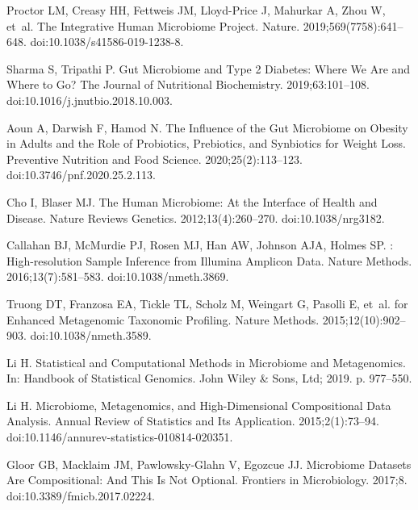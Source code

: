 \documentclass[10pt,letterpaper]{article}
\begin{document}
\begin{thebibliography}{10}

Proctor LM, Creasy HH, Fettweis JM, {Lloyd-Price} J, Mahurkar A, Zhou W, et~al.
\newblock The {{Integrative Human Microbiome Project}}.
\newblock Nature. 2019;569(7758):641--648.
\newblock doi:{10.1038/s41586-019-1238-8}.

Sharma S, Tripathi P.
\newblock Gut Microbiome and Type 2 Diabetes: Where We Are and Where to Go?
\newblock The Journal of Nutritional Biochemistry. 2019;63:101--108.
\newblock doi:{10.1016/j.jnutbio.2018.10.003}.

Aoun A, Darwish F, Hamod N.
\newblock The {{Influence}} of the {{Gut Microbiome}} on {{Obesity}} in
  {{Adults}} and the {{Role}} of {{Probiotics}}, {{Prebiotics}}, and
  {{Synbiotics}} for {{Weight Loss}}.
\newblock Preventive Nutrition and Food Science. 2020;25(2):113--123.
\newblock doi:{10.3746/pnf.2020.25.2.113}.

Cho I, Blaser MJ.
\newblock The Human Microbiome: At the Interface of Health and Disease.
\newblock Nature Reviews Genetics. 2012;13(4):260--270.
\newblock doi:{10.1038/nrg3182}.

Callahan BJ, McMurdie PJ, Rosen MJ, Han AW, Johnson AJA, Holmes SP.
: {{High-resolution}} Sample Inference from {{Illumina}}
  Amplicon Data.
\newblock Nature Methods. 2016;13(7):581--583.
\newblock doi:{10.1038/nmeth.3869}.

Truong DT, Franzosa EA, Tickle TL, Scholz M, Weingart G, Pasolli E, et~al.
 for Enhanced Metagenomic Taxonomic Profiling.
\newblock Nature Methods. 2015;12(10):902--903.
\newblock doi:{10.1038/nmeth.3589}.

Li H.
\newblock Statistical and {{Computational Methods}} in {{Microbiome}} and
  {{Metagenomics}}.
\newblock In: Handbook of {{Statistical Genomics}}. {John Wiley \& Sons, Ltd};
  2019. p. 977--550.

Li H.
\newblock Microbiome, {{Metagenomics}}, and {{High-Dimensional Compositional
  Data Analysis}}.
\newblock Annual Review of Statistics and Its Application. 2015;2(1):73--94.
\newblock doi:{10.1146/annurev-statistics-010814-020351}.

Gloor GB, Macklaim JM, {Pawlowsky-Glahn} V, Egozcue JJ.
\newblock Microbiome {{Datasets Are Compositional}}: {{And This Is Not
  Optional}}.
\newblock Frontiers in Microbiology. 2017;8.
\newblock doi:{10.3389/fmicb.2017.02224}.


\end{thebibliography}
\end{document}
